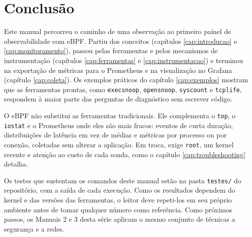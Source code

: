 \chapter{Conclusão}\label{cap:conclusao}

Este manual percorreu o caminho de uma observação ao primeiro painel de observabilidade com eBPF. Partiu dos conceitos (capítulos \ref{cap:introducao} e \ref{cap:monitoramento}), passou pelas ferramentas e pelos mecanismos de instrumentação (capítulos \ref{cap:ferramentas} e \ref{cap:instrumentacao}) e terminou na exportação de métricas para o Prometheus e na visualização no Grafana (capítulo \ref{cap:coleta}). Os exemplos práticos do capítulo \ref{cap:exemplos} mostram que as ferramentas prontas, como \texttt{execsnoop}, \texttt{opensnoop}, \texttt{syscount} e \texttt{tcplife}, respondem à maior parte das perguntas de diagnóstico sem escrever código.

O eBPF não substitui as ferramentas tradicionais. Ele complementa o \texttt{top}, o \texttt{iostat} e o Prometheus onde eles são mais fracos: eventos de curta duração, distribuições de latência em vez de médias e métricas por processo ou por conexão, coletadas sem alterar a aplicação. Em troca, exige \texttt{root}, um kernel recente e atenção ao custo de cada sonda, como o capítulo \ref{cap:troubleshooting} detalha.

Os testes que sustentam os comandos deste manual estão na pasta \texttt{testes/} do repositório, com a saída de cada execução. Como os resultados dependem do kernel e das versões das ferramentas, o leitor deve repeti-los em seu próprio ambiente antes de tomar qualquer número como referência. Como próximos passos, os Manuais 2 e 3 desta série aplicam o mesmo conjunto de técnicas a segurança e a redes.

